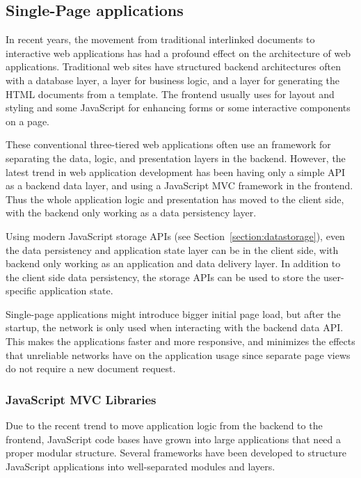 \subsection{Single-Page applications}
\label{section:single-page-applications}

In recent years, the movement from traditional interlinked documents
to interactive web applications has had a profound effect on the
architecture of web applications. Traditional web sites have
structured backend architectures often with a database layer, a layer
for business logic, and a layer for generating the HTML documents from
a template. The frontend usually uses  for layout and
styling and some JavaScript for enhancing forms or some interactive
components on a page.

These conventional three-tiered web applications often use an
 \cite{gamma1995design} framework for separating the data,
logic, and presentation layers in the backend. However, the latest
trend in web application development has been having only a simple
 \cite{fielding2000architectural} API as a backend data
layer, and using a JavaScript MVC framework in the frontend. Thus the
whole application logic and presentation has moved to the client side,
with the backend only working as a data persistency layer.

Using modern JavaScript storage APIs (see
Section~\ref{section:datastorage}), even the data persistency and
application state layer can be in the client side, with backend only
working as an application and data delivery layer. In addition to the
client side data persistency, the storage APIs can be used to store
the user-specific application state.

Single-page applications might introduce bigger initial page load, but
after the startup, the network is only used when interacting with the
backend data API. This makes the applications faster and more
responsive, and minimizes the effects that unreliable networks have on
the application usage since separate page views do not require a new
document request.

\subsubsection{JavaScript MVC Libraries}
\label{section:js-mvc}

Due to the recent trend to move application logic from the backend to
the frontend, JavaScript code bases have grown into large applications
that need a proper modular structure. Several frameworks have been
developed to structure JavaScript applications into well-separated
modules and layers.

